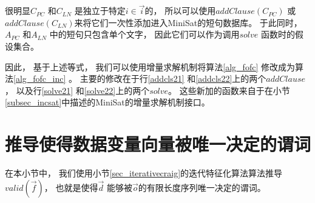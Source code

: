 很明显$C_{PC}$ 和$C_{LN}$ 是独立于特定$i\in \vec{i}$的，
所以可以使用$addClause(C_{PC})$ 或$addClause(C_{LN})$来将它们一次性添加进入MiniSat的短句数据库。
于此同时，
$A_{PC}$ 和$A_{LN}$ 中的短句只包含单个文字，
因此它们可以作为调用$solve$ 函数时的假设集合。

因此，
基于上述等式，
我们可以使用增量求解机制将算法\ref{alg_fofc} 修改成为算法\ref{alg_fofc_inc} 。
主要的修改在于行\ref{addcls21} 和\ref{addcls22}上的两个$addClause$ ，
以及行\ref{solve21} 和\ref{solve22}上的两个$solve$。
这些新加的函数来自于在小节\ref{subsec_incsat}中描述的MiniSat的增量求解机制接口。




\section{推导使得数据变量向量被唯一决定的谓词}\label{sec_infer}

在本小节中，
我们使用小节\ref{sec_iterativecraig}的迭代特征化算法算法推导$valid(\vec{f})$，
也就是使得$\vec{d}$ 能够被$\vec{o}$的有限长度序列唯一决定的谓词。

